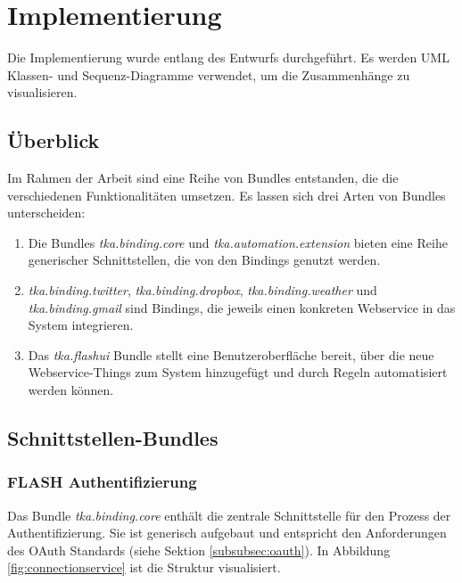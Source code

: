 \chapter{Implementierung}
Die Implementierung wurde entlang des Entwurfs durchgeführt. Es werden UML Klassen- und Sequenz-Diagramme verwendet, um die Zusammenhänge zu visualisieren.

\section{Überblick}
Im Rahmen der Arbeit sind eine Reihe von Bundles entstanden, die die verschiedenen Funktionalitäten umsetzen. Es lassen sich drei Arten von Bundles unterscheiden:
\begin{enumerate}
\item Die Bundles \textit{tka.binding.core} und \textit{tka.automation.extension} bieten eine Reihe generischer Schnittstellen, die von den Bindings genutzt werden.
\item \textit{tka.binding.twitter}, \textit{tka.binding.dropbox}, \textit{tka.binding.weather} und \textit{tka.binding.gmail} sind Bindings, die jeweils einen konkreten Webservice in das System integrieren. 
\item Das \textit{tka.flashui} Bundle stellt eine Benutzeroberfläche bereit, über die neue Webservice-Things zum System hinzugefügt und durch Regeln automatisiert werden können.
\end{enumerate}


\section{Schnittstellen-Bundles}

\subsection{FLASH Authentifizierung}
\label{impl:core}
Das Bundle \textit{tka.binding.core} enthält die zentrale Schnittstelle für den Prozess der Authentifizierung. Sie ist generisch aufgebaut und entspricht den Anforderungen des OAuth Standards (siehe Sektion \ref{subsubsec:oauth}). In Abbildung \ref{fig:connectionservice} ist die Struktur visualisiert.

